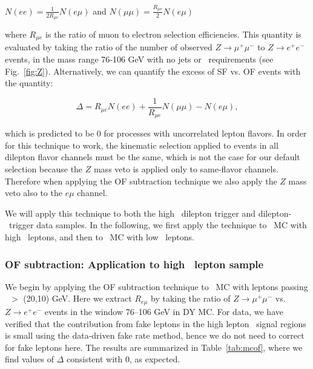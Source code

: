 \begin{center}
$N(ee)     = \frac{1}{2R_{\mu e}}N(e\mu)$ and $N(\mu\mu) = \frac{R_{\mu e}}{2}N(e\mu)$
\end{center}

where $R_{\mu e}$ is the ratio of muon to electron selection efficiencies.
This quantity is evaluated by taking the ratio of the number of observed
$Z \to \mu^+\mu^-$ to $Z \to e^+e^-$ events, in the mass range 76-106 GeV
with no jets or \met\ requirements (see Fig.~\ref{fig:Z}). Alternatively, we can quantify
the excess of SF vs. OF events with the quantity:

\begin{equation}
\label{eq:ofhighpt}
\Delta = R_{\mu e}N(ee) + \frac{1}{R_{\mu e}}N(\mu\mu) - N(e\mu),
\end{equation}

which is predicted to be 0 for processes with uncorrelated lepton flavors. 
In order
for this technique to work, the kinematic selection applied to events in all dilepton
flavor channels must be the same, which is not the case for our default selection because the
$Z$ mass veto is applied only to same-flavor channels. Therefore when applying the OF
subtraction technique we also apply the $Z$ mass veto also to the $e\mu$ channel. 

We will apply this technique to both the high \pt\ dilepton trigger and dilepton-\Ht\ trigger data samples.
In the following, we first apply the technique to \ttbar\ MC with high \pt\ leptons, and then
to \ttbar\ MC with low \pt\ leptons.

\subsubsection{OF subtraction: Application to high \pt\ lepton sample}

We begin by applying the OF subtraction technique to \ttbar\ MC with leptons passing \pt\ $>$ (20,10) GeV.
Here we extract $R_{e\mu}$ by taking the ratio of $Z \to \mu^+\mu^-$ vs. $Z \to e^+e^-$ events in the
window 76--106 GeV in DY MC. 
For data, we have verified that the contribution from fake leptons in the high lepton \pt\
signal regions is small using the data-driven fake rate method, hence we do not need to 
correct for fake leptons here. 
The results are summarized in Table~\ref{tab:mcof}, where we find
values of $\Delta$ consistent with 0, as expected.

